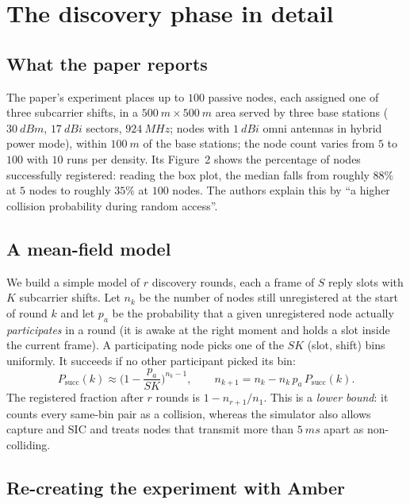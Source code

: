 \section{The discovery phase in detail}
\label{sec:discovery}

\subsection{What the paper reports}

The paper's experiment places up to $100$ passive nodes, each assigned one of three subcarrier shifts, in a $\SI{500}{m}\times\SI{500}{m}$ area served by three base stations ($\SI{30}{dBm}$, $\SI{17}{dBi}$ sectors, $\SI{924}{MHz}$; nodes with $\SI{1}{dBi}$ omni antennas in hybrid power mode), within $\SI{100}{m}$ of the base stations; the node count varies from $5$ to $100$ with $10$ runs per density. Its Figure~2 shows the percentage of nodes successfully registered:
reading the box plot, the median falls from roughly $88\%$ at $5$ nodes to roughly $35\%$ at $100$ nodes. The authors explain this by ``a higher collision probability during random access''.

\subsection{A mean-field model}
\label{sec:meanfield}

We build a simple model of $r$ discovery rounds, each a frame of $S$ reply slots with $K$ subcarrier shifts. Let $n_k$ be the number of nodes still unregistered at the start of round $k$ and let $p_a$ be the probability that a given unregistered node actually
\emph{participates} in a round (it is awake at the right moment and holds a slot inside the current frame). A participating node picks one of the $SK$ (slot, shift) bins uniformly. It succeeds if no other participant picked its bin:
\begin{equation}
 P_{\mathrm{succ}}(k)\approx\Big(1-\frac{p_a}{SK}\Big)^{n_k-1},\qquad
 n_{k+1}=n_k-n_k\,p_a\,P_{\mathrm{succ}}(k).
\label{eq:meanfield}
\end{equation}
The registered fraction after $r$ rounds is $1-n_{r+1}/n_1$. This is a \emph{lower bound}: it counts every same-bin pair as a collision, whereas the simulator also allows capture and SIC and treats nodes that transmit more than $\SI{5}{ms}$ apart as non-colliding.

\subsection{Re-creating the experiment with Amber}
\label{sec:recreate}

